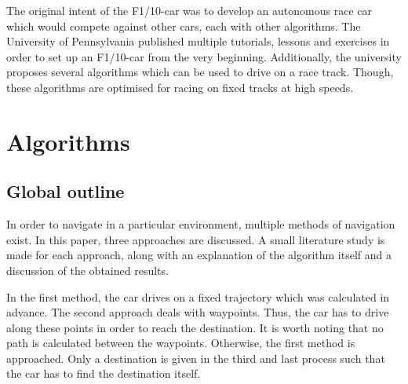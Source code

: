 \documentclass[conference,a4paper]{IEEEtran}
\begin{document}
%

The original intent of the F1/10-car was to develop an autonomous race car which would compete against other cars, each with other algorithms. The University of Pennsylvania \cite{f1tenth} published multiple tutorials, lessons and exercises in order to set up an F1/10-car from the very beginning. Additionally, the university proposes several algorithms which can be used to drive on a race track. Though, these algorithms are optimised for racing on fixed tracks at high speeds. 

\section{Algorithms}
\subsection{Global outline}
 
In order to navigate in a particular environment, multiple methods of navigation exist. In this paper, three approaches are discussed. A small literature study is made for each approach, along with an explanation of the algorithm itself and a discussion of the obtained results.

In the first method, the car drives on a fixed trajectory which was calculated in advance. The second approach deals with waypoints. Thus, the car has to drive along these points in order to reach the destination. It is worth noting that no path is calculated between the waypoints. Otherwise, the first method is approached. Only a destination is given in the third and last process such that the car has to find the destination itself. 
\end{document}
